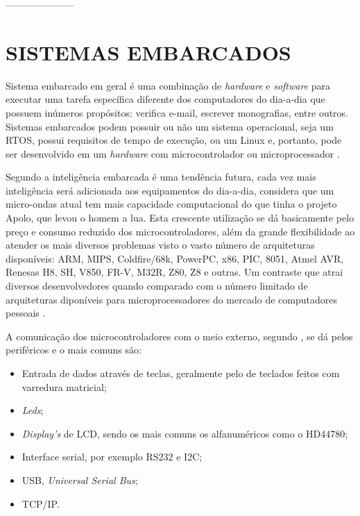 ---------------------

\chapter{SISTEMAS EMBARCADOS}
Sistema embarcado em geral é uma combinação de \emph{hardware} e \emph{software} para executar uma tarefa específica diferente dos computadores do dia-a-dia que possuem inúmeros propósitos: verifica e-mail, escrever monografias, entre outros. Sistemas embarcados podem possuir ou não um sistema operacional, seja um RTOS, possui requisitos de tempo de execução, ou um Linux e, portanto, pode ser desenvolvido em um \emph{hardware} com microcontrolador ou microprocessador \cite{wikibook2012embedded}.

Segundo \cite{cunha2013} a inteligência embarcada é uma tendência futura, cada vez mais inteligência será adicionada aos equipamentos do dia-a-dia, considera que um micro-ondas atual tem mais capacidade computacional do que tinha o projeto Apolo, que levou o homem a lua. Esta crescente utilização se dá basicamente pelo preço e consumo reduzido dos microcontroladores, além da grande flexibilidade ao atender os mais diversos problemas visto o vasto número de arquiteturas disponíveis: ARM, MIPS, Coldfire/68k, PowerPC, x86, PIC, 8051, Atmel AVR, Renesas H8, SH, V850, FR-V, M32R, Z80, Z8 e outras. Um contraste que atrai diversos desenvolvedores quando comparado com o número limitado de arquiteturas diponíveis para microprocessadores do mercado de computadores pessoais \cite{germano2011}.

A comunicação dos microcontroladores com o meio externo, segundo \cite{germano2011}, se dá pelos periféricos e o mais comuns são:
\begin{itemize}
\item Entrada de dados através de teclas, geralmente pelo de teclados feitos com varredura matricial;
\item \emph{Leds};
\item \emph{Display’s} de LCD, sendo os mais comuns os alfanuméricos como o HD44780;
\item Interface serial, por exemplo RS232 e I2C;
\item USB, \emph{Universal Serial Bus};
\item TCP/IP.
\end{itemize}


